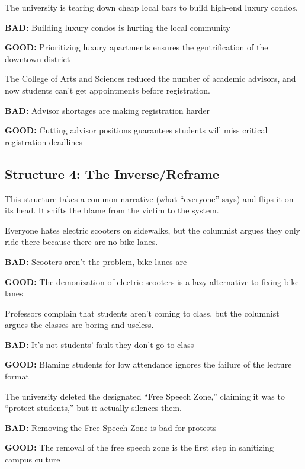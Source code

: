 \documentclass[12pt]{article}
\newcommand{\bad}[1]{\textbf{\textcolor{rose}{BAD:}} #1}
\newcommand{\good}[1]{\textbf{\textcolor{congaree}{GOOD:}} #1}
\newcommand{\context}[1]{#1}
\begin{document}
\begin{exampleblock}
\context{The university is tearing down cheap local bars to build high-end luxury condos.}

\bad{Building luxury condos is hurting the local community}

\good{Prioritizing luxury apartments ensures the gentrification of the downtown district}
\end{exampleblock}

\begin{exampleblock}
\context{The College of Arts and Sciences reduced the number of academic advisors, and now students can't get appointments before registration.}

\bad{Advisor shortages are making registration harder}

\good{Cutting advisor positions guarantees students will miss critical registration deadlines}
\end{exampleblock}

\newpage
\subsection{Structure 4: The Inverse/Reframe}
This structure takes a common narrative (what ``everyone'' says) and flips it on its head. It shifts the blame from the victim to the system.

\begin{exampleblock}
\context{Everyone hates electric scooters on sidewalks, but the columnist argues they only ride there because there are no bike lanes.}

\bad{Scooters aren't the problem, bike lanes are}

\good{The demonization of electric scooters is a lazy alternative to fixing bike lanes}
\end{exampleblock}

\begin{exampleblock}
\context{Professors complain that students aren't coming to class, but the columnist argues the classes are boring and useless.}

\bad{It's not students' fault they don't go to class}

\good{Blaming students for low attendance ignores the failure of the lecture format}
\end{exampleblock}

\begin{exampleblock}
\context{The university deleted the designated ``Free Speech Zone,'' claiming it was to ``protect students,'' but it actually silences them.}

\bad{Removing the Free Speech Zone is bad for protests}

\good{The removal of the free speech zone is the first step in sanitizing campus culture}
\end{exampleblock}
\end{document}
